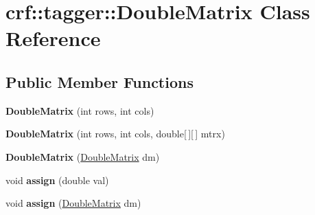 \hypertarget{classcrf_1_1tagger_1_1DoubleMatrix}{
\section{crf::tagger::DoubleMatrix Class Reference}
\label{classcrf_1_1tagger_1_1DoubleMatrix}
}
\subsection*{Public Member Functions}
\begin{DoxyCompactItemize}
\item 
\hypertarget{classcrf_1_1tagger_1_1DoubleMatrix_abf1a305bd8dc75ebdda8774ff42547a8}{
{\bfseries DoubleMatrix} (int rows, int cols)}
\label{classcrf_1_1tagger_1_1DoubleMatrix_abf1a305bd8dc75ebdda8774ff42547a8}

\item 
\hypertarget{classcrf_1_1tagger_1_1DoubleMatrix_a6a90dff557e1b6b12e9deb0ec0463c1e}{
{\bfseries DoubleMatrix} (int rows, int cols, double\mbox{[}$\,$\mbox{]}\mbox{[}$\,$\mbox{]} mtrx)}
\label{classcrf_1_1tagger_1_1DoubleMatrix_a6a90dff557e1b6b12e9deb0ec0463c1e}

\item 
\hypertarget{classcrf_1_1tagger_1_1DoubleMatrix_ab4ddc8a79c50d0fc2cc186e4393b28aa}{
{\bfseries DoubleMatrix} (\hyperlink{classcrf_1_1tagger_1_1DoubleMatrix}{DoubleMatrix} dm)}
\label{classcrf_1_1tagger_1_1DoubleMatrix_ab4ddc8a79c50d0fc2cc186e4393b28aa}

\item 
\hypertarget{classcrf_1_1tagger_1_1DoubleMatrix_a1d647e31251f6f7beeaed8246d9649ff}{
void {\bfseries assign} (double val)}
\label{classcrf_1_1tagger_1_1DoubleMatrix_a1d647e31251f6f7beeaed8246d9649ff}

\item 
\hypertarget{classcrf_1_1tagger_1_1DoubleMatrix_abfe3dec4c51c7fa65caaeb9fb1c1bdc2}{
void {\bfseries assign} (\hyperlink{classcrf_1_1tagger_1_1DoubleMatrix}{DoubleMatrix} dm)}
\label{classcrf_1_1tagger_1_1DoubleMatrix_abfe3dec4c51c7fa65caaeb9fb1c1bdc2}

\end{DoxyCompactItemize}
